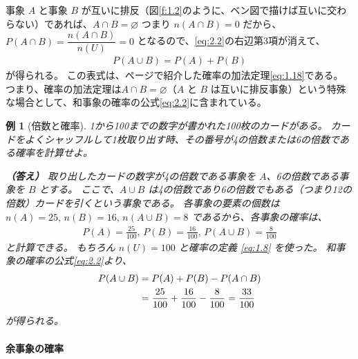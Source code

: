 \documentclass[12pt]{ltjsarticle}\usepackage{ifthen}\newcounter{enlarge}\setcounter{enlarge}{1}
\newtheorem{eg}{例}
\begin{document}
事象 $A$ と事象 $B$ が互いに排反（図\ref{f:1.2}のように、ベン図で描けば互いに交わらない）であれば、$A \cap B = \varnothing$ つまり $ n(A \cap B) = 0$ だから、$P(A \cap B) = \dfrac{n(A \cap B)}{n(U)} = 0$ となるので、\eqref{eq:2.2}の右辺第3項が消えて、
\begin{align}
  P(A \cup B) = P(A) + P(B) \label{eq:2.3}
\end{align}
が得られる。
この表式は、\pageref{eq:1.19}ページで紹介した確率の加法定理\eqref{eq:1.18}である。
つまり、確率の加法定理は$A \cap B = \varnothing$（$A$ と $B$ は互いに排反事象）という特殊な場合として、和事象の確率の公式\eqref{eq:2.2}に含まれている。

\begin{eg}[倍数と確率]
  1から100までの数字が書かれた100枚のカードがある。
  カードをよくシャッフルして1枚取り出す時、その番号が4の倍数または6の倍数である確率を計算せよ。

  \textbf{（答え）}
  取り出したカードの数字が4の倍数である事象を $A$、6の倍数である事象を $B$ とする。
  ここで、$A \cup B$ は4の倍数であり6の倍数でもある（つまり12の倍数）カードを引くという事象である。
  各事象の要素の個数は $n(A) = 25,\, n(B) = 16,\, n(A \cup B) = 8$ であるから、各事象の確率は、
  \begin{align}
    P(A) = \frac{25}{100},\, P(B) = \frac{16}{100},\, P(A \cup B) = \frac{8}{100} \label{eq:2.3.1}
  \end{align}
  と計算できる。
  もちろん $n(U) = 100$ と確率の定義 \eqref{eq:1.8} を使った。
  和事象の確率の公式\eqref{eq:2.2}より、
  \begin{align}
    P(A \cup B) &= P(A) + P(B) - P(A \cap B) \notag \\
                &= \frac{25}{100} + \frac{16}{100} - \frac{8}{100} = \frac{33}{100} \label{eq:2.3.2}
  \end{align}
  が得られる。
\end{eg}

\paragraph{余事象の確率}
\end{document}
